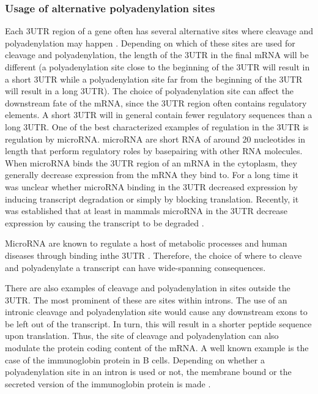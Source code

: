 \subsubsection{Usage of alternative polyadenylation sites}
Each 3\p UTR region of a gene often has several alternative sites where
cleavage and polyadenylation may happen \cite{tian_large-scale_2005}. Depending
on which of these sites are used for cleavage and polyadenylation, the length
of the 3\p UTR in the final mRNA will be different (a polyadenylation site
close to the beginning of the 3\p UTR will result in a short 3\p UTR while a
polyadenylation site far from the beginning of the 3\p UTR will result in a
long 3\p UTR). The choice of polyadenylation site can affect the downstream
fate of the mRNA, since the 3\p UTR region often contains regulatory elements.
A short 3\p UTR will in general contain fewer regulatory sequences than a long
3\p UTR. One of the best characterized examples of regulation in the 3\p UTR is
regulation by microRNA. microRNA are short RNA of around 20 nucleotides in
length that perform regulatory roles by basepairing with other RNA molecules.
When microRNA binds the 3\p UTR region of an mRNA in the cytoplasm, they
generally decrease expression from the mRNA they bind to. For a long time it
was unclear whether microRNA binding in the 3\p UTR decreased expression by
inducing transcript degradation or simply by blocking translation. Recently, it
was established that at least in mammals microRNA in the 3\p UTR decrease
expression by causing the transcript to be degraded
\cite{huntzinger_gene_2011}.

MicroRNA are known to regulate a host of metabolic processes and human diseases
through binding inthe 3\p UTR \cite{huang_biological_2010}. Therefore, the
choice of where to cleave and polyadenylate a transcript can have wide-spanning
consequences.

There are also examples of cleavage and polyadenylation in sites outside the
3\p UTR. The most prominent of these are sites within introns. The use of an
intronic cleavage and polyadenylation site would cause any downstream exons to
be left out of the transcript. In turn, this will result in a shorter peptide
sequence upon translation. Thus, the site of cleavage and polyadenylation can
also modulate the protein coding content of the mRNA. A well known example is
the case of the immunoglobin protein in B cells. Depending on whether a
polyadenylation site in an intron is used or not, the membrane bound or the
secreted version of the immunoglobin protein is made
\cite{peterson_regulated_1989}.

